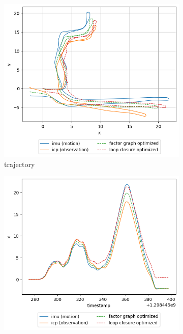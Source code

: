 \documentclass[conference]{IEEEtran}
\begin{document}
\begin{figure}
    \centering
    \begin{subfigure}{0.24\textwidth}
        \includegraphics[width=\linewidth]{../img/trj_20.png}
        \caption{trajectory}
        \label{fig:trj_20}
    \end{subfigure}
    \hfill
    \begin{subfigure}{0.24\textwidth}
        \includegraphics[width=\linewidth]{../img/trj_20_x.png}

\end{subfigure}
\end{figure}
\end{document}

